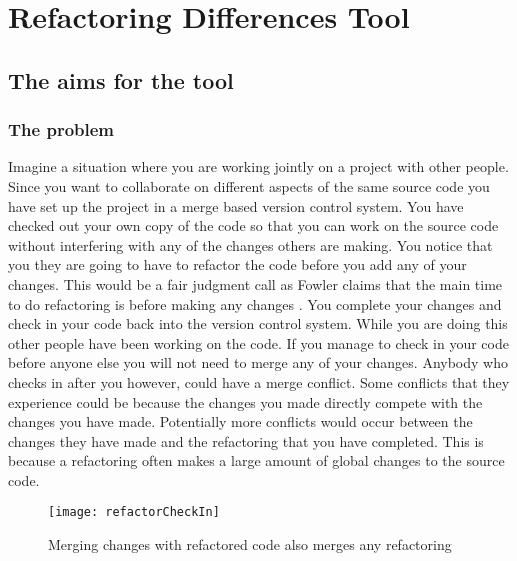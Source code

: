 
\chapter{Refactoring Differences Tool}


\section{The aims for the tool}
\subsection{The problem}
Imagine a situation where you are working jointly on a project with other people. Since you want to collaborate on different aspects of the same source code you have set up the project in a merge based version control system.  You have checked out your own copy of the code so that you can work on the source code without interfering with any of the changes others are making. You notice that you they are going to have to refactor the code before you add any of your changes.  This would be a fair judgment call as Fowler claims that the main time to do refactoring is before making any changes \cite{Fowler1999}. You complete your changes and check in your code back into the version control system.  While you are doing this other people have been working on the code.  If you manage to check in your code before anyone else you will not need to merge any of your changes.  Anybody who checks in after you however, could have a merge conflict.  Some conflicts that they experience could be because the changes you made directly compete with the changes you have made. Potentially more conflicts would occur between the changes they have made and the refactoring that you have completed. This is because a refactoring often makes a large amount of global changes to the source code.

\begin{figure}
\begin{center}
\texttt{[image: refactorCheckIn]}
\end{center}
\caption{Merging changes with refactored code also merges any refactoring}
\end{figure}

